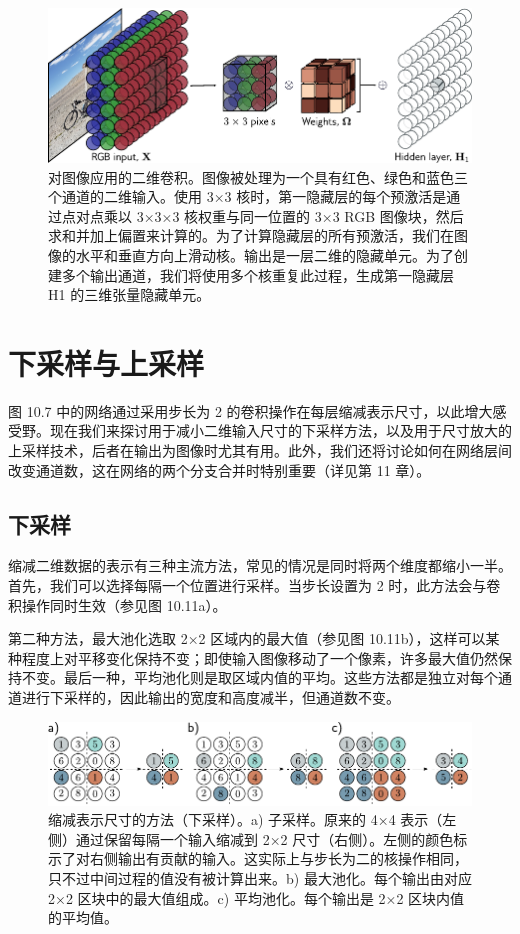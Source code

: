 \documentclass[lang=cn,newtx,10pt,scheme=chinese]{elegantbook}
\begin{document}
\begin{figure}[ht!]
	\centering
	\includegraphics[width=0.7\linewidth]{PDFFigures/UDLChap10PDF/ConvImage.pdf}
	\caption{对图像应用的二维卷积。图像被处理为一个具有红色、绿色和蓝色三个通道的二维输入。使用 3×3 核时，第一隐藏层的每个预激活是通过点对点乘以 3×3×3 核权重与同一位置的 3×3 RGB 图像块，然后求和并加上偏置来计算的。为了计算隐藏层的所有预激活，我们在图像的水平和垂直方向上滑动核。输出是一层二维的隐藏单元。为了创建多个输出通道，我们将使用多个核重复此过程，生成第一隐藏层 H1 的三维张量隐藏单元。}
\end{figure}


\section{下采样与上采样}

图 10.7 中的网络通过采用步长为 2 的卷积操作在每层缩减表示尺寸，以此增大感受野。现在我们来探讨用于减小二维输入尺寸的下采样方法，以及用于尺寸放大的上采样技术，后者在输出为图像时尤其有用。此外，我们还将讨论如何在网络层间改变通道数，这在网络的两个分支合并时特别重要（详见第 11 章）。
\subsection{下采样}
缩减二维数据的表示有三种主流方法，常见的情况是同时将两个维度都缩小一半。首先，我们可以选择每隔一个位置进行采样。当步长设置为 2 时，此方法会与卷积操作同时生效（参见图 10.11a）。

第二种方法，最大池化选取 2×2 区域内的最大值（参见图 10.11b），这样可以某种程度上对平移变化保持不变；即使输入图像移动了一个像素，许多最大值仍然保持不变。最后一种，平均池化则是取区域内值的平均。这些方法都是独立对每个通道进行下采样的，因此输出的宽度和高度减半，但通道数不变。

\begin{figure}[ht!]
	\centering
	\includegraphics[width=0.7\linewidth]{PDFFigures/UDLChap10PDF/ConvDown.pdf}
	\caption{缩减表示尺寸的方法（下采样）。a) 子采样。原来的 4×4 表示（左侧）通过保留每隔一个输入缩减到 2×2 尺寸（右侧）。左侧的颜色标示了对右侧输出有贡献的输入。这实际上与步长为二的核操作相同，只不过中间过程的值没有被计算出来。b) 最大池化。每个输出由对应 2×2 区块中的最大值组成。c) 平均池化。每个输出是 2×2 区块内值的平均值。}
\end{figure}
\end{document}
